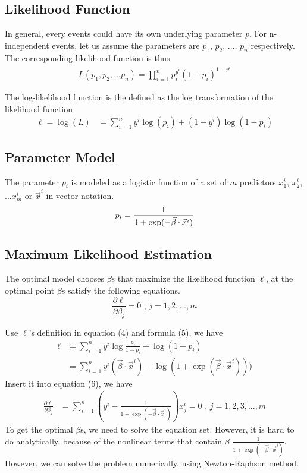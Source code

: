 \documentclass[12pt, oneside]{article}
\begin{document}
\subsection{Likelihood Function}
In general, every events could have its own underlying parameter $p$. For n-independent events, let us assume the parameters are $p_1$, $p_2$, ..., $p_n$ respectively. The corresponding likelihood function is thus
\begin{align}
L(p_1, p_2,...p_n)=\prod_{i=1}^{n}p_{i}^{y^i}(1-p_{i})^{1-y^{i}}\end{align}

The log-likelihood function is the defined as the log transformation of the likelihood function
\begin{align}
\ell=\log(L)&={\sum_{i=1}^{n}y^i\log(p_i)+(1-y^i)\log(1-p_i)}
\end{align}

\subsection{Parameter Model}
The parameter $p_i$ is modeled as a logistic function of a set of $m$ predictors $x_1^i$, $x_2^i$, ...$x_m^i$ or $\vec{x}^i$ in vector notation.
\begin{equation}
\mathnormal{p_i}=\frac{1}{1+\mathnormal{\exp(-\vec{\beta}\cdot\vec{x}^i)}}
\end{equation}

\subsection{Maximum Likelihood Estimation}
The optimal model chooses $\beta$s that maximize the likelihood function $\ell$, at the optimal point $\beta$s satisfy the following equations.
\begin{equation}
\frac{\partial \ell}{\partial \beta_j}=0 \text{ , }j = 1, 2, ..., m
\end{equation}

Use $\ell$'s definition in equation (4) and formula (5), we have 
\begin{align*}
{\ell}&=\sum_{i=1}^{n}y^i\log\frac{p_i}{1-p_i}+\log(1-p_i)\\
&=\sum_{i=1}^{n}y^i(\vec{\beta}\cdot\vec{x}^i)-\log(1+\exp(\vec{\beta}\cdot\vec{x}^i)))
\end{align*}
Insert it into equation (6), we have
\begin{align*}
{\frac{\partial\ell}{\partial\beta_j}}
&={\sum_{i=1}^{n}\left (y^i-\frac{1}{1+\exp(-\vec{\beta}\cdot\vec{x}^i)} \right) x_{j}^{i}}=0 \text{ , } {j=1, 2, 3, ...,m}
\end{align*}
To get the optimal $\beta$s, we need to solve the equation set. However, it is hard to do analytically, because of the nonlinear terms that contain 
$\beta$ $\frac{1}{1+\exp(-\vec{\beta}\cdot\vec{x}^i)}$. However, we can solve the problem numerically, using Newton-Raphson method.
\end{document}
